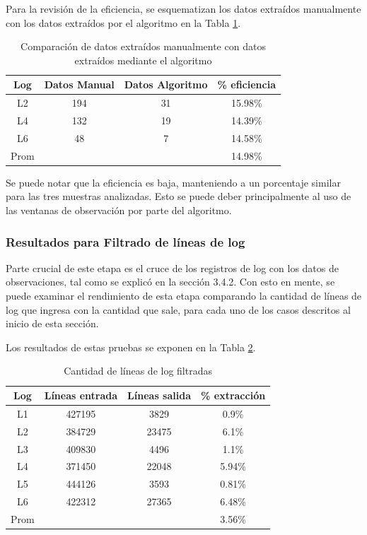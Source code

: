 Para la revisión de la eficiencia, se esquematizan los datos extraídos manualmente con los datos extraídos por el algoritmo en la Tabla \ref{table:eficiencia}.

\begin{table}[h]
    \centering
    \ttfamily
    \begin{tabular}{|c|c|c|c|}
        \hline
        Log & Datos Manual & Datos Algoritmo & \% eficiencia \\
        \hline \hline
        L2 & 194 & 31 & 15.98\% \\
        \hline
        L4 & 132 & 19 & 14.39\% \\
        \hline
        L6 & 48 & 7 & 14.58\% \\
        \hline
        Prom &  &  & 14.98\% \\
        \hline
    \end{tabular}
    \caption{\label{table:eficiencia} Comparación de datos extraídos manualmente con datos extraídos mediante el algoritmo}
\end{table}

Se puede notar que la eficiencia es baja, manteniendo a un porcentaje similar para las tres muestras analizadas. Esto se puede deber principalmente al uso de las ventanas de observación por parte del algoritmo. 

\subsubsection{Resultados para Filtrado de líneas de log}

Parte crucial de este etapa es el cruce de los registros de log con los datos de observaciones, tal como se explicó en la sección 3.4.2. Con esto en mente, se puede examinar el rendimiento de esta etapa comparando la cantidad de líneas de log que ingresa con la cantidad que sale, para cada uno de los casos descritos al inicio de esta sección.

Los resultados de estas pruebas se exponen en la Tabla \ref{table:etapa1}.

\begin{table}[h]
    \centering
    \ttfamily
    \begin{tabular}{|c|c|c|c|}
        \hline
        Log & Líneas entrada & Líneas salida & \% extracción \\
        \hline \hline
        L1 & 427195 & 3829 & 0.9\% \\
        \hline
        L2 & 384729 & 23475 & 6.1\% \\
        \hline
        L3 & 409830 & 4496 & 1.1\% \\
        \hline
        L4 & 371450 & 22048 & 5.94\% \\
        \hline
        L5 & 444126 & 3593 & 0.81\% \\
        \hline
        L6 & 422312 & 27365 & 6.48\% \\
        \hline
        Prom &  &  & 3.56\% \\
        \hline
    \end{tabular}
    \caption{\label{table:etapa1} Cantidad de líneas de log filtradas}
\end{table}

